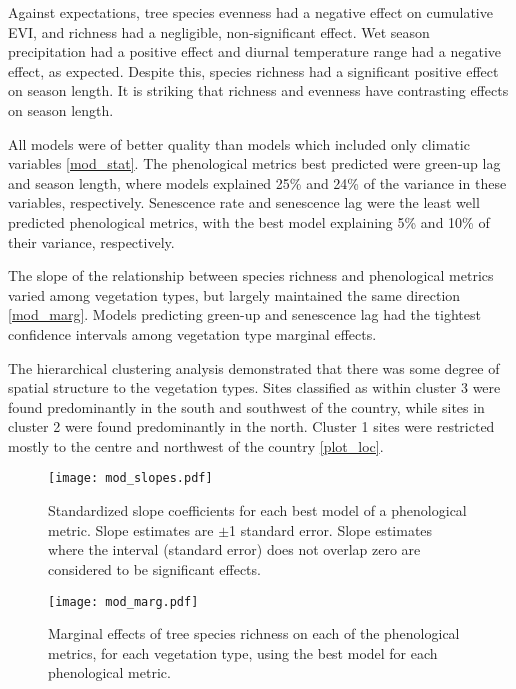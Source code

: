 \documentclass[11pt,a4paper]{article}
\begin{document}
Against expectations, tree species evenness had a negative effect on cumulative EVI, and richness had a negligible, non-significant effect. Wet season precipitation had a positive effect and diurnal temperature range had a negative effect, as expected. Despite this, species richness had a significant positive effect on season length. It is striking that richness and evenness have contrasting effects on season length.

All models were of better quality than models which included only climatic variables \autoref{mod_stat}. The phenological metrics best predicted were green-up lag and season length, where models explained 25\% and 24\% of the variance in these variables, respectively. Senescence rate and senescence lag were the least well predicted phenological metrics, with the best model explaining 5\% and 10\% of their variance, respectively.

The slope of the relationship between species richness and phenological metrics varied among vegetation types, but largely maintained the same direction \autoref{mod_marg}. Models predicting green-up and senescence lag had the tightest confidence intervals among vegetation type marginal effects.

The hierarchical clustering analysis demonstrated that there was some degree of spatial structure to the vegetation types. Sites classified as within cluster 3 were found predominantly in the south and southwest of the country, while sites in cluster 2 were found predominantly in the north. Cluster 1 sites were restricted mostly to the centre and northwest of the country \autoref{plot_loc}.



 

\begin{figure}[H]
\centering
	\texttt{[image: mod\_slopes.pdf]}
	\caption{Standardized slope coefficients for each best model of a phenological metric. Slope estimates are $\pm$1 standard error. Slope estimates where the interval (standard error) does not overlap zero are considered to be significant effects.}
	\label{mod_slopes}
\end{figure}

\begin{figure}[H]
\centering
	\texttt{[image: mod\_marg.pdf]}
	\caption{Marginal effects of tree species richness on each of the phenological metrics, for each vegetation type, using the best model for each phenological metric.}
	\label{mod_marg}
\end{figure}
\end{document}
